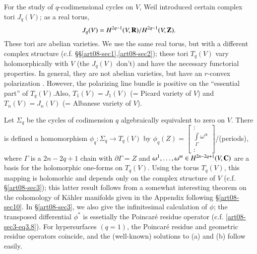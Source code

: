 For the study of $q$-codimensional cycles on $V$, Weil introduced certain complex tori $J_{q}(V)$; as a real torus,
$$
J_{q}(V)=H^{2q-1}(V,\mathbf{R})/H^{2q-1}(V,\mathbf{Z}).
$$
These tori are abelian varieties. We use the same real torus, but with a different complex structure (c.f. \S\S\ref{art08-sec1},\ref{art08-sec2}); these tori $T_{q}(V)$ vary holomorphically with $V$ (the $J_{q}(V)$ don't) and have the necessary functorial properties. In general, they are not abelian varieties, but have an $r$-convex polarization \cite{art08-key9}. However, the polarizing line bundle is positive on the ``essential part'' of $T_{q}(V)$.\pageoriginale Also, $T_{1}(V)=J_{1}(V)$ (= Picard variety of $V$) and $T_{n}(V)=J_{n}(V)$ (= Albanese variety of $V$).

Let $\Sigma_{q}$ be the cycles of codimension $q$ algebraically equivalent to zero on $V$. There is defined a homomorphism $\phi_{q}:\Sigma_{q}\to T_{q}(V)$ by $\phi_{q}(Z)=\left[\begin{smallmatrix}:\\ \int\limits_{\Gamma}\omega^{\alpha}\\ :\end{smallmatrix}\right]$/(periods), where $\Gamma$ is a $2n-2q+1$ chain with $\partial \Gamma=Z$ and $\omega^{1},\ldots,\omega^{m}\in H^{2n-2q+1}(V,\mathbf{C})$ are a basis for the holomorphic one-forms on $T_{q}(V)$. Using the torus $T_{q}(V)$, this mapping is holomorhic and depends only on the complex structure of $V$ (c.f. \S\ref{art08-sec3}); this latter result follows from a somewhat interesting theorem on the cohomology of K\"ahler manifolds given in the Appendix following \S\ref{art08-sec10}. In \S\ref{art08-sec3}, we also give the infinitesimal calculation of $\phi$; the transposed differential $\phi^{*}$ is essetially the Poincar\'e residue operator (c.f. \eqref{art08-sec3-eq3.8}). For hypersurfaces $(q=1)$, the Poincar\'e residue and geometric residue operators coincide, and the (well-known) solutions to (a) and (b) follow easily.

